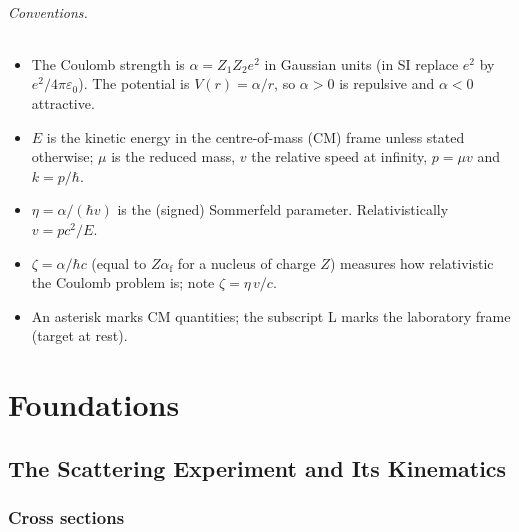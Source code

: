 \documentclass[11pt,a4paper]{book}
\numberwithin{equation}{chapter}
\newcommand{\afs}{\alpha_{\mathrm{f}}}
\begin{document}
\paragraph{Conventions.}
\begin{itemize}
  \item The Coulomb strength is $\alpha=Z_1Z_2e^2$ in Gaussian units (in SI
        replace $e^2$ by $e^2/4\pi\varepsilon_0$). The potential is
        $V(r)=\alpha/r$, so $\alpha>0$ is repulsive and $\alpha<0$ attractive.
  \item $E$ is the kinetic energy in the centre-of-mass (CM) frame unless
        stated otherwise; $\mu$ is the reduced mass, $v$ the relative speed at
        infinity, $p=\mu v$ and $k=p/\hbar$.
  \item $\eta=\alpha/(\hbar v)$ is the (signed) Sommerfeld parameter.
        Relativistically $v=pc^2/E$.
  \item $\zeta=\alpha/\hbar c$ (equal to $Z\afs$ for a nucleus of charge $Z$)
        measures how relativistic the Coulomb problem is; note
        $\zeta=\eta\,v/c$.
  \item An asterisk marks CM quantities; the subscript L marks the laboratory
        frame (target at rest).
\end{itemize}

\mainmatter

\part{Foundations}

\chapter{The Scattering Experiment and Its Kinematics}

\section{Cross sections}
\end{document}
